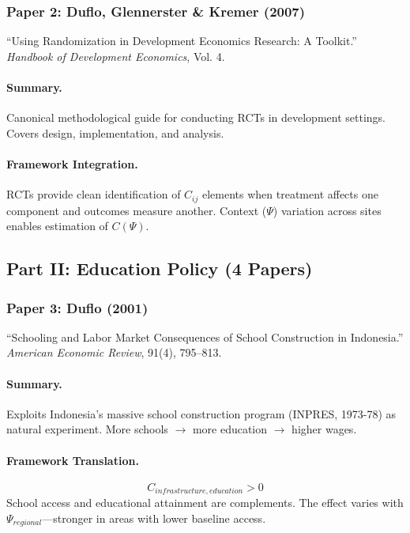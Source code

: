 \documentclass[12pt,a4paper]{article}
\begin{document}
\subsubsection{Paper 2: Duflo, Glennerster \& Kremer (2007)}

``Using Randomization in Development Economics Research: A Toolkit.''
\textit{Handbook of Development Economics}, Vol. 4.

\paragraph{Summary.}
Canonical methodological guide for conducting RCTs in development settings.
Covers design, implementation, and analysis.

\paragraph{Framework Integration.}
RCTs provide clean identification of $C_{ij}$ elements when treatment affects
one component and outcomes measure another. Context ($\Psi$) variation across
sites enables estimation of $C(\Psi)$.

\subsection{Part II: Education Policy (4 Papers)}

\subsubsection{Paper 3: Duflo (2001)}

``Schooling and Labor Market Consequences of School Construction in Indonesia.''
\textit{American Economic Review}, 91(4), 795--813.

\paragraph{Summary.}
Exploits Indonesia's massive school construction program (INPRES, 1973-78) as
natural experiment. More schools $\rightarrow$ more education $\rightarrow$ higher wages.

\paragraph{Framework Translation.}
\begin{equation}
  C_{infrastructure, education} > 0
\end{equation}
School access and educational attainment are complements. The effect varies with
$\Psi_{regional}$---stronger in areas with lower baseline access.
\end{document}
